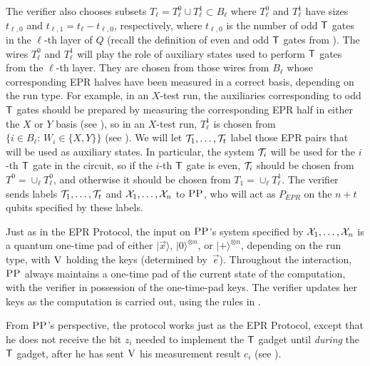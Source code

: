 \documentclass{toc}
\newcommand{\ket}[1]{|#1\rangle}
\newcommand{\ver}{\textsc{V}}
\newcommand{\pp}{\textsc{PP}}
\begin{document}
The verifier also chooses subsets
$T_\ell = T_\ell^0 \cup T_\ell^1 \subset B_\ell$ 
%
%
%
%
where $T_\ell^0$ and $T_\ell^1$ have %
sizes $t_{\ell,0}$ and $t_{\ell,1} = t_\ell-t_{\ell,0}$, respectively,
where $t_{\ell,0}$ is the number of odd $\sf T$ gates in the $\ell$-th layer of $Q$ (recall the definition of even and odd $\sf T$ gates from ). The wires $T^0_\ell$ and $T^1_\ell$ will play the role of auxiliary states used to perform $\sf T$ gates from the $\ell$-th layer. They are chosen from those wires from $B_\ell$ whose corresponding EPR halves have been measured in a correct basis, depending on the run type.  For example, in an $X$-test run, the auxiliaries corresponding to odd $\sf T$ gates should be prepared by measuring the corresponding EPR half in either the $X$ or $Y$ basis (see ), so in an $X$-test run, $T_\ell^1$ is chosen from $\{i\in B_\ell:\,W_i\in \{X,Y\}\}$ (see ). We will let ${\cal T}_1,\dots,{\cal T}_t$ label those EPR pairs that will be used as auxiliary states. In particular, the system ${\cal T}_i$ will be used for the $i$-th $\sf T$ gate in the circuit, so if the $i$-th $\sf T$ gate is even, ${\cal T}_i$ should be chosen from $T^0=\cup_\ell T_\ell^0$, and otherwise it should be chosen from $T_1=\cup_\ell T_\ell^1$. The verifier sends labels ${\cal T}_1,\dots,{\cal T}_t$ and ${\cal X}_1,\dots,{\cal X}_n$ to $\pp$, who will act as $P_{EPR}$ on the $n+t$ qubits specified by these labels.


Just as in the EPR Protocol, the input on $\pp$'s system specified by ${\cal X}_1,\dots,{\cal X}_n$ is a quantum one-time pad of either $\ket{\vec{x}}$, $\ket{0}^{\otimes n}$, or $\ket{+}^{\otimes n}$, depending on the run type, with $\ver$ holding the keys (determined by~$\vec{e}$). Throughout the interaction, $\pp$ always maintains a one-time pad of the current state of the computation, with the verifier in possession of the one-time-pad keys. The verifier updates her keys as the computation is carried out, using the rules in . 




From $\pp$'s perspective, the protocol works just as the EPR Protocol, except that he does not receive the bit $z_i$ needed to implement the $\sf T$ gadget until \emph{during} the $\sf T$ gadget, after he has sent $\ver$ his measurement result $c_i$ (see ).


 
\end{document}
